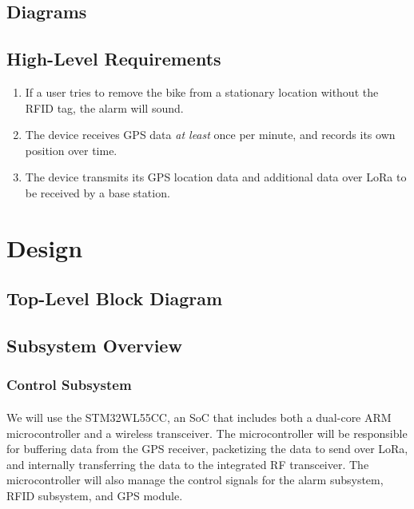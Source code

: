\documentclass[]{article}
\begin{document}
\subsection{Diagrams}

\subsection{High-Level Requirements}

\begin{enumerate}
	\item If a user tries to remove the bike from a stationary location without the RFID tag, the alarm will sound. 
	
	\item The device receives GPS data \textit{at least} once per minute, and records its own position over time.  
	
	\item The device transmits its GPS location data and additional data over LoRa to be received by a base station. 
	
\end{enumerate}

\section{Design}
\subsection{Top-Level Block Diagram}

\subsection{Subsystem Overview}
\subsubsection{Control Subsystem}

\paragraph{}
 We will use the STM32WL55CC, an SoC that includes both a dual-core ARM microcontroller and a wireless transceiver. The microcontroller will be responsible for buffering data from the GPS receiver, packetizing the data to send over LoRa, and internally transferring the data to the integrated RF transceiver. The microcontroller will also manage the control signals for the alarm subsystem, RFID subsystem, and GPS module. 
\end{document}
